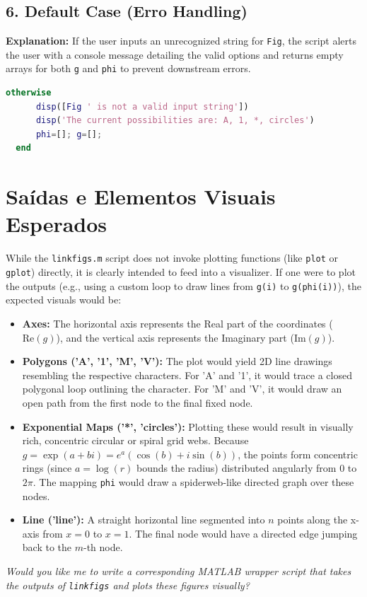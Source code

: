 \subsection{6. Default Case (Erro Handling)}
\textbf{Explanation:} If the user inputs an unrecognized string for \texttt{Fig}, the script alerts the user with a console message detailing the valid options and returns empty arrays for both \texttt{g} and \texttt{phi} to prevent downstream errors.

\begin{lstlisting}[language=Matlab]
    otherwise
      disp([Fig ' is not a valid input string'])
      disp('The current possibilities are: A, 1, *, circles')
      phi=[]; g=[];
  end
\end{lstlisting}

\section{Saídas e Elementos Visuais Esperados}

While the \texttt{linkfigs.m} script does not invoke plotting functions (like \texttt{plot} or \texttt{gplot}) directly, it is clearly intended to feed into a visualizer. If one were to plot the outputs (e.g., using a custom loop to draw lines from \texttt{g(i)} to \texttt{g(phi(i))}), the expected visuals would be:

\begin{itemize}
    \item \textbf{Axes:} The horizontal axis represents the Real part of the coordinates ($\text{Re}(g)$), and the vertical axis represents the Imaginary part ($\text{Im}(g)$).
    \item \textbf{Polygons ('A', '1', 'M', 'V'):} The plot would yield 2D line drawings resembling the respective characters. For 'A' and '1', it would trace a closed polygonal loop outlining the character. For 'M' and 'V', it would draw an open path from the first node to the final fixed node.
    \item \textbf{Exponential Maps ('*', 'circles'):} Plotting these would result in visually rich, concentric circular or spiral grid webs. Because $g = \exp(a + bi) = e^a(\cos(b) + i\sin(b))$, the points form concentric rings (since $a = \log(r)$ bounds the radius) distributed angularly from $0$ to $2\pi$. The mapping \texttt{phi} would draw a spiderweb-like directed graph over these nodes.
    \item \textbf{Line ('line'):} A straight horizontal line segmented into $n$ points along the x-axis from $x=0$ to $x=1$. The final node would have a directed edge jumping back to the $m$-th node.
\end{itemize}

\vspace{1em}
\noindent \textit{Would you like me to write a corresponding MATLAB wrapper script that takes the outputs of \texttt{linkfigs} and plots these figures visually?}
